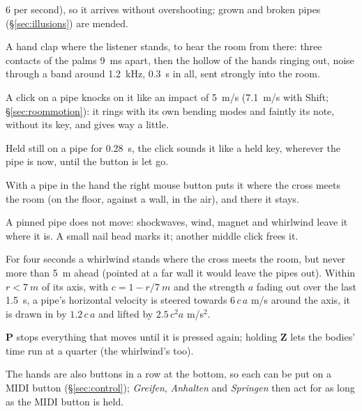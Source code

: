 \documentclass[11pt,a4paper,parskip=half,DIV=11,toc=bibliography]{scrartcl}
\newcommand{\ui}[1]{\emph{#1}}                 %
\begin{document}
\begin{description}
        6 per second), so it arrives without overshooting; grown and broken pipes (\S\ref{sec:illusions}) are mended.
  \item[C -- clap.] A hand clap where the listener stands, to hear the room from there: three contacts of the palms \SI{9}{ms} apart, then the hollow
        of the hands ringing out, noise through a band around \SI{1.2}{kHz}, \SI{0.3}{s} in all, sent strongly into the room.
  \item[Click -- knock.] A click on a pipe knocks on it like an impact of \SI{5}{m/s} (\SI{7.1}{m/s} with Shift; \S\ref{sec:roommotion}): it rings with its own
        bending modes and faintly its note, without its key, and gives way a little.
  \item[Click held -- bow.] Held still on a pipe for \SI{0.28}{s}, the click sounds it like a held key, wherever the pipe is now, until the button
        is let go.
  \item[Right button with Q -- set down.] With a pipe in the hand the right mouse button puts it where the cross meets the room (on the floor,
        against a wall, in the air), and there it stays.
  \item[Middle button -- pin.] A pinned pipe does not move: shockwaves, wind, magnet and whirlwind leave it where it is. A small nail head marks it;
        another middle click frees it.
  \item[T -- whirlwind.] For four seconds a whirlwind stands where the cross meets the room, but never more than \SI{5}{m} ahead (pointed at a far wall it
        would leave the pipes out). Within $r<\SI{7}{m}$ of its axis, with $c = 1-r/\SI{7}{m}$ and the strength $a$ fading out over the last
        \SI{1.5}{s}, a pipe's horizontal velocity is steered towards $6\,c\,a$ m/s around the axis, it is drawn in by $1.2\,c\,a$ and lifted by
        $2.5\,c^2 a$ m/s$^2$.
  \item[P -- pause, Z (held) -- slow motion.] \textbf{P} stops everything that moves until it is pressed again; holding \textbf{Z} lets the
        bodies' time run at a quarter (the whirlwind's too).
\end{description}
The hands are also buttons in a row at the bottom, so each can be put on a MIDI button (\S\ref{sec:control}); \ui{Greifen}, \ui{Anhalten} and
\ui{Springen} then act for as long as the MIDI button is held.
\end{document}
